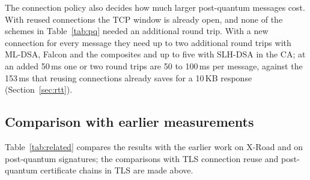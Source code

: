 \documentclass[conference,a4paper]{IEEEtran}
\newcommand{\newtext}[1]{{\color{blue}#1}}
\begin{document}
The connection policy also decides how much larger post-quantum messages cost. \newtext{With reused
connections the TCP window is already open, and none of the schemes in Table~\ref{tab:pq} needed an
additional round trip. With a new connection for every message they need up to two additional round
trips with ML-DSA, Falcon and the composites and up to five with SLH-DSA in the CA; at an added
50\,ms one or two round trips are 50 to 100\,ms per message, against the 153\,ms that reusing
connections already saves for a 10\,KB response (\newtext{Section~\ref{sec:rtt}}).}

\subsection{Comparison with earlier measurements}

{\color{blue}Table~\ref{tab:related} compares the results with the earlier work on X-Road and on \newtext{post-quantum signatures; the
comparisons with TLS connection reuse and post-quantum certificate chains in TLS are made above}.\par}
\end{document}
